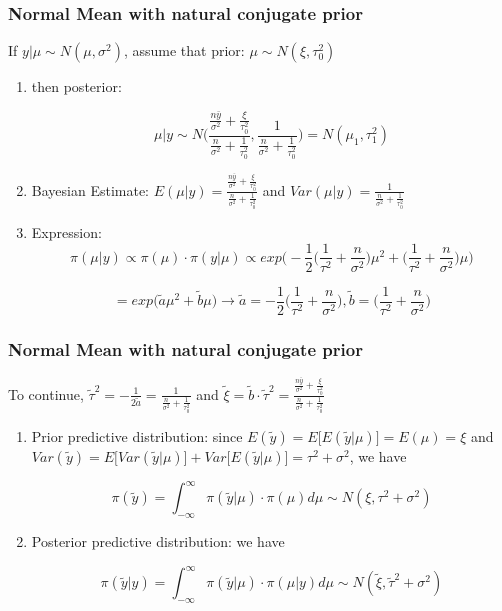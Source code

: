 \documentclass{beamer}
\begin{document}

\begin{frame}
\frametitle{Normal Mean with natural conjugate prior}

If $y|\mu \sim N(\mu, \sigma^2)$, assume that prior: $\mu \sim N(\xi,\tau_0^2)$
\begin{enumerate}
\item then posterior: 

$$\mu|y \sim N\Big(\frac{\frac{n \bar y}{\sigma^2}+\frac{\xi}{\tau_0^2}}{\frac{n}{\sigma^2}+\frac{1}{\tau_0^2}}, \frac{1}{\frac{n}{\sigma^2}+\frac{1}{\tau_0^2}}\Big) = N(\mu_1, \tau_1^2)$$

\item Bayesian Estimate: $E(\mu|y) = \frac{\frac{n \bar y}{\sigma^2}+\frac{\xi}{\tau_0^2}}{\frac{n}{\sigma^2}+\frac{1}{\tau_0^2}}$ and $Var(\mu|y) = \frac{1}{\frac{n}{\sigma^2}+\frac{1}{\tau_0^2}}$

\item Expression: 
$$\pi(\mu|y) \propto \pi(\mu) \cdot \pi(y|\mu)\propto exp\Bigg(-\frac{1}{2}\Big(\frac{1}{\tau^2}+\frac{n}{\sigma^2}\Big) \mu^2 + \Big(\frac{1}{\tau^2}+\frac{n}{\sigma^2}\Big)\mu \Bigg)$$

$$= exp\Big(\tilde a \mu^2 + \tilde b \mu\Big)\rightarrow \tilde a = -\frac{1}{2}\Big(\frac{1}{\tau^2}+\frac{n}{\sigma^2}\Big), \tilde b =\Big(\frac{1}{\tau^2}+\frac{n}{\sigma^2}\Big) $$


\end{enumerate}

\end{frame}


\begin{frame}
\frametitle{Normal Mean with natural conjugate prior}

To continue, $\tilde \tau^2 = -\frac{1}{2 \tilde a} = \frac{1}{\frac{n}{\sigma^2}+\frac{1}{\tau_0^2}}$ and $\tilde \xi = \tilde b \cdot \tilde \tau^2 = \frac{\frac{n \bar y}{\sigma^2}+\frac{\xi}{\tau_0^2}}{\frac{n}{\sigma^2}+\frac{1}{\tau_0^2}}$

\begin{enumerate}
\item Prior predictive distribution: since $E(\tilde y) = E\Big[E(\tilde y|\mu)\Big] = E(\mu) = \xi$ and $Var(\tilde y) = E\Big[Var(\tilde y|\mu)\Big] + Var\Big[E(\tilde y|\mu)\Big] = \tau^2 + \sigma^2$, we have

$$\pi(\tilde y) = \int_{-\infty}^{\infty} \pi(\tilde y|\mu) \cdot \pi(\mu)d\mu \sim N(\xi, \tau^2 + \sigma^2)$$

\item Posterior predictive distribution: we have

$$\pi(\tilde y|y) = \int_{-\infty}^{\infty} \pi(\tilde y|\mu) \cdot \pi(\mu|y)d\mu \sim N(\tilde \xi, \tilde \tau^2 + \sigma^2)$$

\end{enumerate}

\end{frame}
\end{document}
